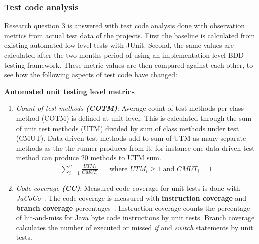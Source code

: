     \subsubsection{Test code analysis}
    \label{subsub:test}
    Research question 3 is answered with test code analysis done with observation metrics from actual test data of the projects.
    First the baseline is calculated from existing automated low level tests with JUnit. Second, the same values are calculated
    after the two months period of using an implementation level BDD testing framework. These metric values are then compared
    against each other, to see how the following aspects of test code have changed:
    \clearpage
    \begin{addmargin}[0em]{0em}
    \vspace{10px}
    \textbf{Automated unit testing level metrics}
    \vspace{5px}
    \newline
    \begin{enumerate}
    \item \textit{Count of test methods \textbf{(COTM)}}:
    Average count of test methods per class method (COTM) is defined at unit level. This is calculated through the sum
    of unit test methods (UTM) divided by sum of class methods under test (CMUT). Data driven test methods add to sum of UTM as
    many separate methods as the the runner produces from it, for instance one data driven test method can produce 20 methods to UTM sum.
    \begin{align*}
        \sum_{i=1}^{n}\frac{UTM_{i}}{CMUT_{i}} && \text {where } UTM_{i} \geq 1 \text{ and } CMUT_{i} = 1
    \end{align*}
    \item \textit{Code coverage \textbf{(CC)}}:
    Measured code coverage for unit tests is done with \textit{JaCoCo}~\cite{jacoco}. The code coverage is measured with
    \textbf{instruction coverage} and \textbf{branch coverage} percentages~\cite{jacoco-coverage}. Instruction coverage counts the percentage
    of hit-and-miss for Java byte code instructions by unit tests. Branch coverage calculates the number of executed or missed \textit{if}
    and \textit{switch} statements by unit tests.
    \end{enumerate}
    \end{addmargin}


